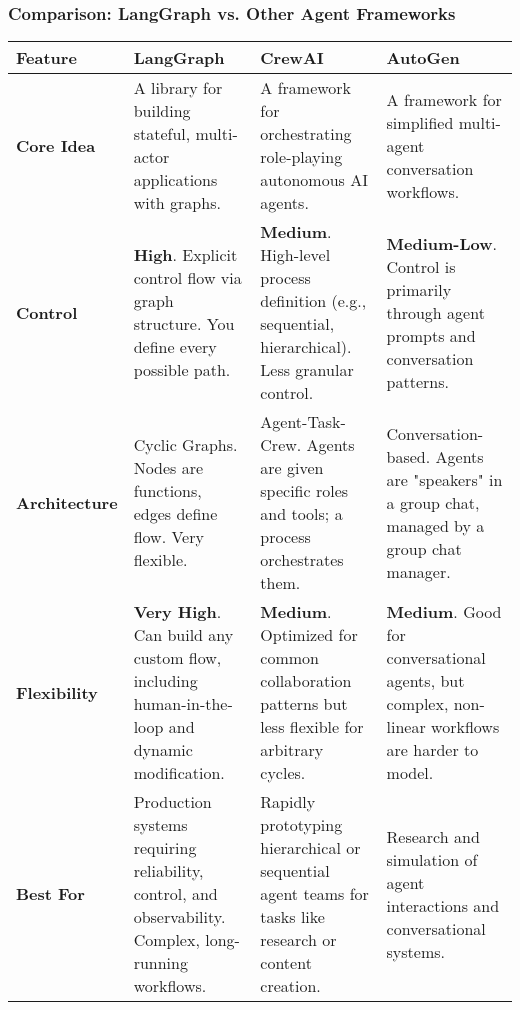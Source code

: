 \begin{frame}[fragile]\frametitle{Comparison: LangGraph vs. Other Agent Frameworks}
\tiny
\begin{tabular}{|l|p{3.5cm}|p{3.5cm}|p{3.5cm}|}
\hline
\textbf{Feature} & \textbf{LangGraph} & \textbf{CrewAI} & \textbf{AutoGen} \\
\hline
\textbf{Core Idea} & A library for building stateful, multi-actor applications with graphs. & A framework for orchestrating role-playing autonomous AI agents. & A framework for simplified multi-agent conversation workflows. \\
\hline
\textbf{Control} & \textbf{High}. Explicit control flow via graph structure. You define every possible path. & \textbf{Medium}. High-level process definition (e.g., sequential, hierarchical). Less granular control. & \textbf{Medium-Low}. Control is primarily through agent prompts and conversation patterns. \\
\hline
\textbf{Architecture} & Cyclic Graphs. Nodes are functions, edges define flow. Very flexible. & Agent-Task-Crew. Agents are given specific roles and tools; a process orchestrates them. & Conversation-based. Agents are "speakers" in a group chat, managed by a group chat manager. \\
\hline
\textbf{Flexibility} & \textbf{Very High}. Can build any custom flow, including human-in-the-loop and dynamic modification. & \textbf{Medium}. Optimized for common collaboration patterns but less flexible for arbitrary cycles. & \textbf{Medium}. Good for conversational agents, but complex, non-linear workflows are harder to model. \\
\hline
\textbf{Best For} & Production systems requiring reliability, control, and observability. Complex, long-running workflows. & Rapidly prototyping hierarchical or sequential agent teams for tasks like research or content creation. & Research and simulation of agent interactions and conversational systems. \\
\hline
\end{tabular}
\end{frame}

